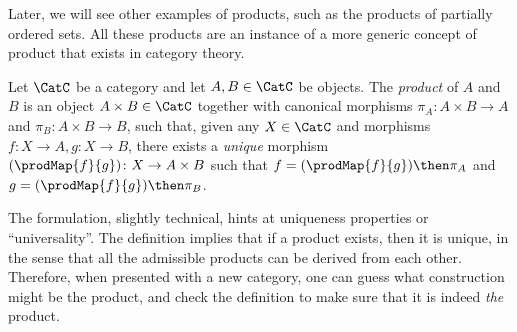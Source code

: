 Later, we will see other examples of products, such as the products of partially ordered sets.
All these products are an instance of a more generic concept of product that exists in category
theory.
 
\begin{shaded}
\begin{definition}
Let $\CatC$ be a category and let $A,B\in \CatC$ be objects. The \emph{product} of $A$ and $B$ is an object $A \times B \in \CatC$ together with canonical morphisms $\pi_A \colon A \times B \to A$ and $\pi_B \colon A \times B \to B$, such that, given any $X \in \CatC$ and morphisms $f \colon X \to A, g \colon X \to B$, there exists a \emph{unique} morphism $(\prodMap{f}{g}) \colon X \to A \times B$ such that $f = (\prodMap{f}{g})\then \pi_A$ and $g=(\prodMap{f}{g})\then \pi_B$.
\end{definition}
\end{shaded}

The formulation, slightly technical, hints at uniqueness properties or ``universality''.
The definition implies that if a product exists, then it is unique, in the sense
that all the admissible products can be derived from each other. Therefore, when
presented with a new category, one can guess what construction might be the product, and check
the definition to make sure that it is indeed \emph{the} product.


